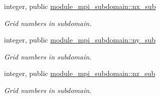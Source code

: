 \begin{DoxyCompactItemize}
\item 
integer, public \mbox{\hyperlink{namespacemodule__mpi__subdomain_ac0a0da3865fce334d01c602c949a680f}{module\+\_\+mpi\+\_\+subdomain\+::nx\+\_\+sub}}
\begin{DoxyCompactList}\small\item\em Grid numbers in subdomain. \end{DoxyCompactList}\item 
integer, public \mbox{\hyperlink{namespacemodule__mpi__subdomain_a337008dffc01586ae3a149d255115e30}{module\+\_\+mpi\+\_\+subdomain\+::ny\+\_\+sub}}
\begin{DoxyCompactList}\small\item\em Grid numbers in subdomain. \end{DoxyCompactList}\item 
integer, public \mbox{\hyperlink{namespacemodule__mpi__subdomain_a6df401547925214a36e4aaf656380a48}{module\+\_\+mpi\+\_\+subdomain\+::nz\+\_\+sub}}
\begin{DoxyCompactList}\small\item\em Grid numbers in subdomain. \end{DoxyCompactList}\end{DoxyCompactItemize}

